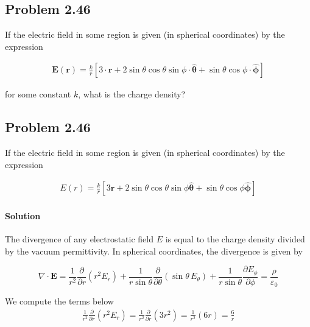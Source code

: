 \documentclass{article}
\newcommand{\bvec}[1]{\mathbf{\hat{#1}}}
\begin{document}
\subsection*{Problem 2.46}
If the electric field in some region is given (in spherical coordinates) by the expression

\begin{align*}
    \mathbf{E}(\mathbf{r}) = \frac{k}{r}\left[ 3\cdot \bvec{r} + 2\sin\theta\cos\theta\sin\phi\cdot \bvec{\theta} + \sin\theta\cos\phi \cdot \bvec{\phi} \right]
\end{align*}

for some constant $k$, what is the charge density?

\newpage

\subsection*{Problem 2.46}
If the electric field in some region is given (in spherical coordinates) by the expression 

\begin{align*}
    E(r) =\frac{k}{r}[3\bvec{r} + 2\sin\theta\cos\theta\sin\phi \bvec{\theta} + \sin\theta\cos\phi \bvec{\phi}]
\end{align*}

\paragraph{Solution} The divergence of any electrostatic field $E$ is equal to the charge density divided by the vacuum permittivity.  In spherical coordinates, the divergence is given by 

\[
\nabla \cdot \mathbf{E} = \frac{1}{r^2}\frac{\partial}{\partial r}\left(r^2 E_r\right)
+\frac{1}{r\sin\theta}\frac{\partial}{\partial \theta}\left(\sin\theta\, E_\theta\right)
+\frac{1}{r\sin\theta}\frac{\partial E_\phi}{\partial \phi} = \frac{\rho}{\varepsilon_0}
\]


We compute the terms below\\


\begin{align*}
    \frac{1}{r^2}\frac{\partial}{\partial r}\left(r^2 E_r\right) = \frac{1}{r^2}\frac{\partial}{\partial r}(3r^2) = \frac{1}{r^2}(6r) = \frac{6}{r}
\end{align*}
\end{document}
